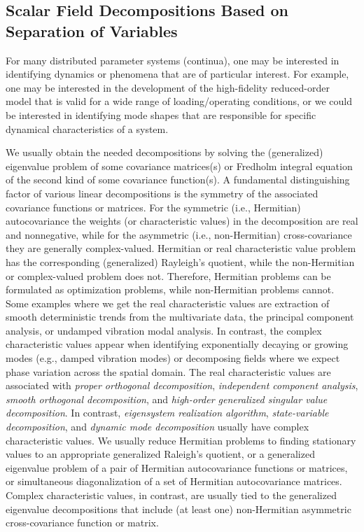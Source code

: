 \documentclass[10pt]{article}
\begin{document}
\subsection{Scalar Field Decompositions Based on Separation of Variables}\label{intro}

For many distributed parameter systems (continua), one may be interested in identifying dynamics or phenomena that are of particular interest.
For example, one may be interested in the development of the high-fidelity reduced-order model that is valid for a wide range of loading/operating conditions, or we could be interested in identifying mode shapes that are responsible for specific dynamical characteristics of a system.

We usually obtain the needed decompositions by solving the (generalized) eigenvalue problem of some covariance matrices(s) or Fredholm integral equation of the second kind of some covariance function(s).
A fundamental distinguishing factor of various linear decompositions is the symmetry of the associated covariance functions or matrices.
For the symmetric (i.e., Hermitian) autocovariance the weights (or characteristic values) in the decomposition are real and nonnegative, while for the asymmetric (i.e., non-Hermitian) cross-covariance they are generally complex-valued.
Hermitian or real characteristic value problem has the corresponding (generalized) Rayleigh's quotient, while the non-Hermitian or complex-valued problem does not.
Therefore, Hermitian problems can be formulated as optimization problems, while non-Hermitian problems cannot.
Some examples where we get the real characteristic values are extraction of smooth deterministic trends from the multivariate data, the principal component analysis, or undamped vibration modal analysis.
In contrast, the complex characteristic values appear when identifying exponentially decaying or growing modes (e.g., damped vibration modes) or decomposing fields where we expect phase variation across the spatial domain.
The real characteristic values are associated with {\em proper orthogonal decomposition}, {\em independent component analysis}, {\em smooth orthogonal decomposition}, and {\em high-order generalized singular value decomposition}.
In contrast, {\em eigensystem realization algorithm}, {\em state-variable decomposition}, and {\em dynamic mode decomposition} usually have complex characteristic values.
We usually reduce Hermitian problems to finding stationary values to an appropriate generalized Raleigh's quotient, or a generalized eigenvalue problem of a pair of Hermitian autocovariance functions or matrices, or simultaneous diagonalization of a set of Hermitian autocovariance matrices.
Complex characteristic values, in contrast, are usually tied to the generalized eigenvalue decompositions that include (at least one) non-Hermitian asymmetric cross-covariance function or matrix.
\end{document}
